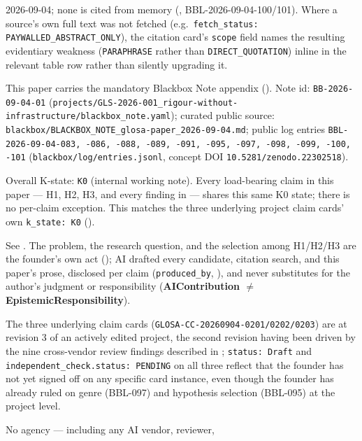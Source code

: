 \begin{disclaimers}
    2026-09-04; none is cited from memory (,
    BBL-2026-09-04-100/101). Where a source's own full text was not fetched
    (e.g.\ \texttt{fetch\_status: PAYWALLED\_ABSTRACT\_ONLY}), the citation
    card's \texttt{scope} field names the resulting evidentiary weakness
    (\texttt{PARAPHRASE} rather than \texttt{DIRECT\_QUOTATION}) inline in
    the relevant table row rather than silently upgrading it.
  \item[D-BLACKBOX-NOTE] This paper carries the mandatory Blackbox Note
    appendix (). Note id: \texttt{BB-2026-09-04-01}
    (\texttt{projects/GLS-2026-001\_rigour-without-infrastructure/blackbox\_note.yaml});
    curated public source:
    \texttt{blackbox/BLACKBOX\_NOTE\_glosa-paper\_2026-09-04.md}; public log
    entries \texttt{BBL-2026-09-04-083, -086, -088, -089, -091, -095, -097,
    -098, -099, -100, -101} (\texttt{blackbox/log/entries.jsonl}, concept DOI
    \texttt{10.5281/zenodo.22302518}).
  \item[D-K-STATE] Overall K-state: \texttt{K0} (internal working note). Every
    load-bearing claim in this paper --- H1, H2, H3, and every finding in
     --- shares this same K0 state; there is no
    per-claim exception. This matches the three underlying project claim
    cards' own \texttt{k\_state: K0} ().
  \item[D-AUTHORSHIP] See . The problem, the research
    question, and the selection among H1/H2/H3 are the founder's own act
    (); AI drafted every candidate,
    citation search, and this paper's prose, disclosed per claim
    (\texttt{produced\_by}, ), and never substitutes
    for the author's judgment or responsibility
    (\textbf{AIContribution $\neq$ EpistemicResponsibility}).
  \item[D-REVISION-LIVE] The three underlying claim cards
    (\texttt{GLOSA-CC-20260904-0201/0202/0203}) are at revision 3 of an
    actively edited project, the second revision having been driven by the
    nine cross-vendor review findings described in ;
    \texttt{status: Draft} and \texttt{independent\_check.status: PENDING} on
    all three reflect that the founder has not yet signed off on any specific
    card instance, even though the founder has already ruled on genre
    (BBL-097) and hypothesis selection (BBL-095) at the project level.
  \item[D-NO-EPISTEMIC-VETO] No agency --- including any AI vendor, reviewer,

\end{disclaimers}
